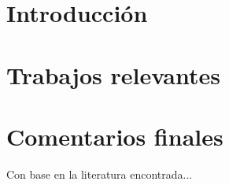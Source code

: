 \label{chap:state art}

\section{Introducción}\label{sec:art intro}

    \lipsum[17]

    \lipsum[18]
    
\section{Trabajos relevantes}\label{sec:art relevant research}

    \lipsum[17]

    \lipsum[17]

    \lipsum[17]

    \lipsum[17]
    
    
\section{Comentarios finales}\label{sec:art comments}
    
    Con base en la literatura encontrada...